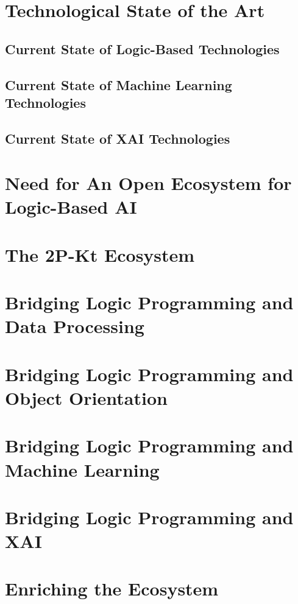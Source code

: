 \documentclass[12pt,a4paper,openright,twoside]{book}
\begin{document}
\chapter{Technological State of the Art}

\section{Current State of Logic-Based Technologies}

\section{Current State of Machine Learning Technologies}

\section{Current State of XAI Technologies}

\chapter{Need for An Open Ecosystem for Logic-Based AI}

\chapter{The 2P-Kt Ecosystem}

\chapter{Bridging Logic Programming and Data Processing}

\chapter{Bridging Logic Programming and Object Orientation}

\chapter{Bridging Logic Programming and Machine Learning}

\chapter{Bridging Logic Programming and XAI}

\chapter{Enriching the Ecosystem}
\end{document}
